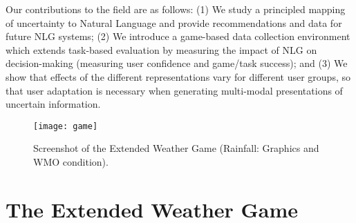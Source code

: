 \documentclass[11pt]{article}
\begin{document}
Our contributions to the field are as follows: 
(1) We study a  principled mapping of uncertainty to Natural Language and provide recommendations and data for future NLG systems;
(2) We introduce a game-based data collection environment which extends task-based evaluation by measuring the impact of NLG on decision-making (measuring user confidence and game/task success); 
and (3) We show that effects of the different representations vary for different user groups, so that user adaptation is necessary when generating multi-modal presentations of uncertain information.



\begin{figure*}[t]
    \centering
    \texttt{[image: game]}
    \caption{Screenshot of the Extended Weather Game (Rainfall: Graphics and  WMO condition).}
    \label{fig:screenshot}
\end{figure*}


\section{The Extended Weather Game} \label{weather-game}
\end{document}
